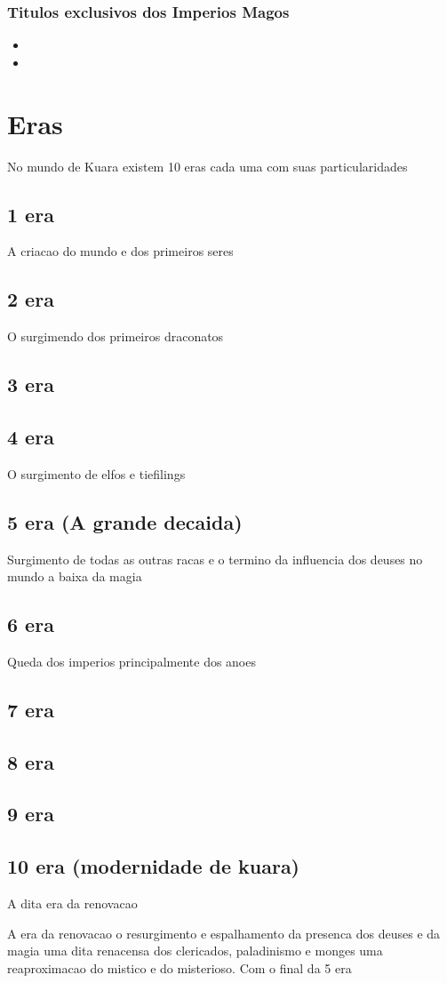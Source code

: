 \documentclass{book}
\begin{document}
\section{Titulos exclusivos dos Imperios Magos}
\begin{itemize}
    \item
    \item
\end{itemize}

\part{Eras}
No mundo de Kuara existem 10 eras cada uma com suas particularidades

\chapter{1 era}
A criacao do mundo  e dos primeiros seres
\chapter{2 era}
O surgimendo dos primeiros draconatos 
\chapter{3 era}
\chapter{4 era}
O surgimento de elfos e tiefilings
\chapter{5 era (A grande decaida)}
Surgimento de todas as outras racas
e o termino da influencia dos deuses no mundo a baixa da magia
\chapter{6 era}
Queda dos imperios principalmente dos anoes
\chapter{7 era}
\chapter{8 era}
\chapter{9 era}
\chapter{10 era (modernidade de kuara)}
A dita era da renovacao 

A era da renovacao o resurgimento e espalhamento da presenca dos deuses e da magia uma dita 
renacensa dos clericados, paladinismo e monges uma reaproximacao do mistico e do misterioso.
Com o final da 5 era 
\end{document}
